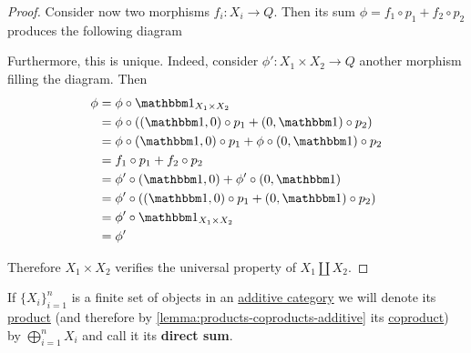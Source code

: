 \documentclass[../../../main]{subfiles}
\begin{document}
\begin{proof}
  Consider now two morphisms \(f_{i}: X_{i} \to Q\).
  Then its sum \(\phi = f_{1} \circ p_{1} + f_{2} \circ p_{2}\) produces the following diagram
  \begin{center}
  \end{center}
  Furthermore, this is unique.
  Indeed, consider \(\phi': X_{1} \times X_{2} \to Q\) another morphism filling the diagram. Then
  \begin{align*}
    \phi &= \phi \circ \id_{X_{1} \times X_{2}} \\
      &= \phi \circ ( (\id, 0) \circ p_{1} + (0, \id) \circ p_{2} ) \\
      &= \phi \circ (\id, 0) \circ p_{1} + \phi \circ (0, \id) \circ p_{2} \\
      &= f_{1} \circ p_{1} + f_{2} \circ p_{2} \\
      &= \phi' \circ (\id, 0) + \phi' \circ (0, \id) \\
      &= \phi' \circ ( (\id, 0) \circ p_{1} + (0, \id) \circ p_{2} ) \\
      &= \phi' \circ \id_{X_{1} \times X_{2}} \\
      &= \phi'
  \end{align*}

  Therefore \(X_{1} \times X_{2}\) verifies the universal property of \(X_{1} \amalg X_{2}\).
\end{proof}

\begin{notation}\label{def:direct-sum}
  If \(\{X_{i}\}_{i=1}^{n}\) is a finite set of objects in an \hyperref[def:additive-category]{additive category} we will denote its \hyperref[def:categorical-product]{product} (and therefore by \autoref{lemma:products-coproducts-additive} its \hyperref[def:categorical-coproduct]{coproduct}) by \(\bigoplus_{i=1}^{n} X_{i}\) and call it its \textbf{direct sum}.
\end{notation}
\end{document}
